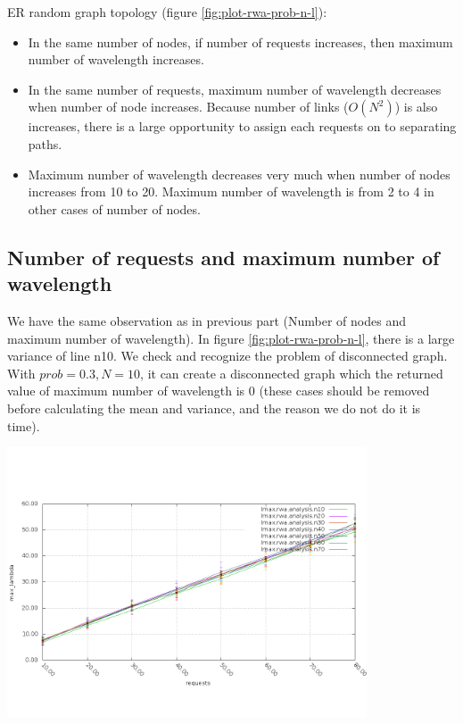 \documentclass[a4paper]{article}
\begin{document}
ER random graph topology (figure \ref{fig:plot-rwa-prob-n-l}):
\begin{itemize}
	\item In the same number of nodes, if number of requests increases, then maximum number of wavelength increases.
	\item In the same number of requests, maximum number of wavelength decreases when number of node increases. Because number of links ($O(N^2)$) is also increases, there is a large opportunity to assign each requests on to separating paths.
	\item Maximum number of wavelength decreases very much when number of nodes increases from 10 to 20. Maximum number of wavelength is from 2 to 4 in other cases of number of nodes.
\end{itemize}

\subsection{Number of requests and maximum number of wavelength}
We have the same observation as in previous part (Number of nodes and maximum number of wavelength). In figure \ref{fig:plot-rwa-prob-n-l}, there is a large variance of line n10. We check and recognize the problem of disconnected graph. With $prob = 0.3, N = 10$, it can create a disconnected graph which the returned value of maximum number of wavelength is 0 (these cases should be removed before calculating the mean and variance, and the reason we do not do it is time).
    \begin{center}
    \includegraphics[width=0.8\textwidth]{rwa-ring-results/plot_rwa_r_l.png}
    \label{fig:plot-rwa-ring-n-l}
    \end{center}
\end{document}
